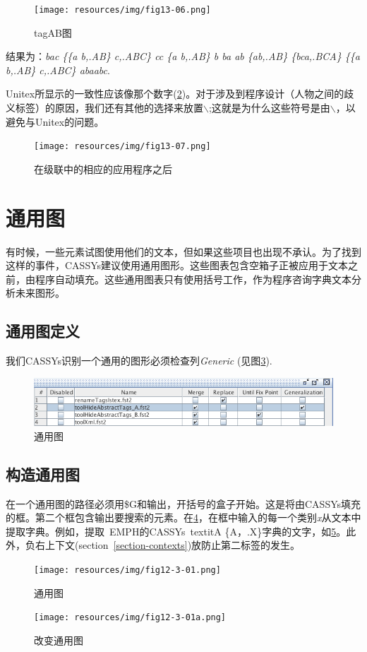 \begin{figure}[!htb]
  \centering
  \texttt{[image: resources/img/fig13-06.png]}
  \caption{tagAB图}
  \label{fig13-06}
\end{figure}

\bigskip
\noindent 结果为：\emph{bac \{\{a b,.AB\} c,.ABC\} cc \{a b,.AB\} b ba ab \{ab,.AB\} \{bca,.BCA\} \{\{a b,.AB\} c,.ABC\} abaabc}.


\bigskip
\noindent Unitex所显示的一致性应该像那个数字(\ref{fig13-07})。对于涉及到程序设计（人物之间的歧义标签）的原因，我们还有其他的选择来放置$\backslash$;这就是为什么这些符号是由$\backslash$，以避免与Unitex的问题。
\begin{figure}[!htb]
  \centering
  \texttt{[image: resources/img/fig13-07.png]}
  \caption{在级联中的相应的应用程序之后}
  \label{fig13-07}
\end{figure}

\section{通用图}

有时候，一些元素试图使用他们的文本，但如果这些项目也出现不承认。为了找到这样的事件，CASSYs建议使用通用图形。这些图表包含空箱子正被应用于文本之前，由程序自动填充。这些通用图表只有使用括号工作，作为程序咨询字典文本分析未来图形。

\subsection{通用图定义}
我们CASSYs识别一个通用的图形必须检查列\emph{Generic} (见图\ref{fig12-3}).
\begin{figure}[!htb]
  \centering
  \includegraphics[width=15cm]{resources/img/fig12-3.png}
  \caption{通用图}
  \label{fig12-3}
\end{figure}

\subsection{构造通用图}
在一个通用图的路径必须用\$G和输出，开括号的盒子开始。这是将由CASSYs填充的框。第二个框包含输出要搜索的元素。在\ref{fig12-3-01}，在框中输入的每一个类别\textit{x}从文本中提取字典。例如，提取\ EMPH的CASSYs\ textit{A} {\{A，.X\}}字典的文字，如\ref{fig12-3-01a}。此外，负右上下文(section~\ref{section-contexts})放防止第二标签的发生。\begin{figure}[!htb]
  \centering
  \texttt{[image: resources/img/fig12-3-01.png]}
  \caption{通用图}
  \label{fig12-3-01}
\end{figure}
\begin{figure}[!htb]
  \centering
  \texttt{[image: resources/img/fig12-3-01a.png]}
  \caption{改变通用图}
  \label{fig12-3-01a}
\end{figure}


